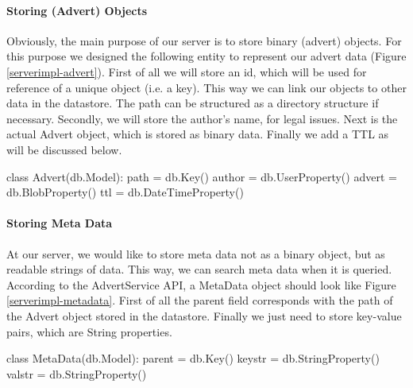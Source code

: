 \paragraph{Storing (Advert) Objects}
Obviously, the main purpose of our server is to store binary (advert) objects.
For this purpose we designed the following entity to represent our advert data
(Figure \ref{serverimpl-advert}). First of all we will store an id, which will be used for
reference of a unique object (i.e. a key). This way we can link our objects to
other data in the datastore. The path can be structured as a directory structure
if necessary. Secondly, we will store the author's name, for legal issues. Next
is the actual Advert object, which is stored as binary data. Finally we add a TTL
as will be discussed below.

\begin{figure*}[ht] %
\begin{center}
\begin{code}
class Advert(db.Model):
  path    = db.Key()
  author  = db.UserProperty()
  advert  = db.BlobProperty()
  ttl     = db.DateTimeProperty()
\end{code}
\caption{An Advert Object.\label{serverimpl-advert}}
\end{center}
\end{figure*}

\paragraph{Storing Meta Data}
At our server, we would like to store meta data not as a binary object, but as
readable strings of data. This way, we can search meta data when it is queried.
According to the AdvertService API, a MetaData object should look like Figure
\ref{serverimpl-metadata}. First of all the parent field corresponds with the
path of the Advert object stored in the datastore. Finally we just need to store
key-value pairs, which are String properties.

\begin{figure*}[ht] %
\begin{center}
\begin{code}
class MetaData(db.Model):
  parent  = db.Key()
  keystr  = db.StringProperty()
  valstr  = db.StringProperty()
\end{code}
\caption{A MetaData Object.\label{serverimpl-metadata}}
\end{center}
\end{figure*}

